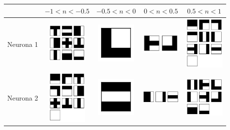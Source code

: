\documentclass[12pt]{article}
\begin{document}
\begin{center}
   \begin{tabular}{| c | c | c | c | c |}
     \hline
      & $-1<n<-0.5$ & $-0.5<n<0$ & $0<n<0.5$ & $0.5<n<1$ \\ \hline
     Neurona 1 &
     \includegraphics[width=2cm]{graficosde3neuronas/atributo0Clase0} &
     \includegraphics[width=2cm]{graficosde3neuronas/atributo0Clase1} &
     \includegraphics[width=2cm]{graficosde3neuronas/atributo0Clase2} &
     \includegraphics[width=2cm]{graficosde3neuronas/atributo0Clase3} \\ \hline
     Neurona 2 &
     \includegraphics[width=2cm]{graficosde3neuronas/atributo1Clase0} &
     \includegraphics[width=2cm]{graficosde3neuronas/atributo1Clase1} &
     \includegraphics[width=2cm]{graficosde3neuronas/atributo1Clase2} &
     \includegraphics[width=2cm]{graficosde3neuronas/atributo1Clase3} \\ \hline

\end{tabular}
\end{center}
\end{document}
